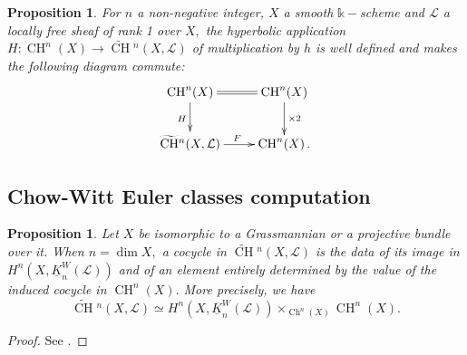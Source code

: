 \documentclass{amsart}
\theoremstyle{plain}%
\newtheorem{prop}[subsubsection]{Proposition}
\theoremstyle{remark}
\theoremstyle{definition}
\newcommand{\cL}{\mathcal{L}}
\newcommand{\ek}{\mathbb{k}}
\newcommand{\eZ}{\mathbb{Z}}
\newcommand{\fId}{{\mathbf{I}}}
\newcommand{\sKW}{\underline{K}^W}
\newcommand{\Chowtilde}[2][]{\widetilde{\operatorname{CH}}{}^{#1}\!\left(#2\right)}
\newcommand{\Chowct}[2][]{\operatorname{CH}^{#1}\!\left( #2 \right)}
\newcommand{\Chd}[2][]{\operatorname{Ch}^{#1}\!\left( #2 \right)}
\begin{document}
\begin{prop}\label{PROP - fonction hyperbolique bien def torsion}
For $n$ a non-negative integer, $X$ a smooth $\ek-$scheme and $\cL$ a locally free sheaf of rank 1 over $X,$ the hyperbolic application $H: \Chowct[n]{X} \to \Chowtilde[n]{X,\cL}$ of multiplication by $h$ is well defined and makes the following diagram commute:
\[\xymatrix{\Chowct[n]{X}\ar[d]_{H} \ar@{=}[r] & \Chowct[n]{X} \ar[d]^{\times 2}\\
\Chowtilde[n]{X,\cL} \ar[r]^F & \Chowct[n]{X}. }\]
\end{prop}



\subsection{Chow-Witt Euler classes computation}\label{SSEC - calcul classes Euler}







\begin{prop}\label{PROP - CW comme image H et Witt}
Let $X$ be isomorphic to a Grassmannian or a projective bundle over it. When $n = \dim X,$ a cocycle in $\Chowtilde[n]{X,\cL}$ is the data of its image in $H^n(X,\underline{K}^W_n(\cL))$ and of an element  entirely determined by the value of the induced cocycle in $\Chowct[n]{X}.$ More precisely, we have
\[\Chowtilde[n]{X,\cL} \simeq H^n(X,\sKW_n(\cL))\times_{\Chd[n]{X}}\Chowct[n]{X}.\]
\end{prop}

\begin{proof}
See \cite[Proposition 3.4.1]{Cha_dP2-4}.
\end{proof}
\end{document}
